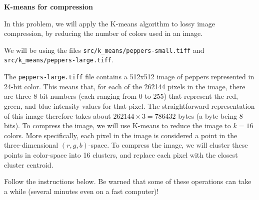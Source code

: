 \item {} {\bf K-means for compression}

In this problem, we will apply the K-means algorithm to lossy image
compression, by reducing the number of colors used in an image.

We will be using the files \texttt{src/k\_means/peppers-small.tiff} and \texttt{src/k\_means/peppers-large.tiff}.
	

The \texttt{peppers-large.tiff} file contains
a 512x512 image of peppers represented in 24-bit color. This means
that, for each of the 262144 pixels in the image, there are three
8-bit numbers (each ranging from 0 to 255) that represent the red,
green, and blue intensity values for that pixel. The straightforward
representation of this image therefore takes about $262144 \times 3 =
786432$ bytes (a byte being 8 bits). To compress the image, we will
use K-means to reduce the image to $k = 16$ colors. More specifically,
each pixel in the image is considered a point in the three-dimensional
$(r, g, b)$-space. To compress the image, we will cluster these points
in color-space into 16 clusters, and replace each pixel with the
closest cluster centroid.

Follow the instructions below. Be warned that some of these operations
can take a while (several minutes even on a fast computer)!


\begin{enumerate}

  
\ifnum{} {
  
} \fi


  

\ifnum{} {
  
} \fi

\end{enumerate}

